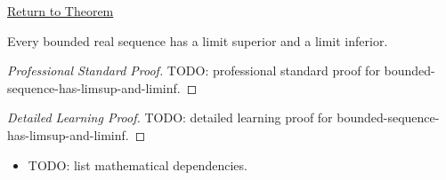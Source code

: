 \newpage
{}
\label{prf:bounded-sequence-limsup-liminf}

\begin{remark*}[Return]
\hyperref[thm:bounded-sequence-limsup-liminf]{Return to Theorem}
\end{remark*}

\begin{theorem*}
Every bounded real sequence has a limit superior and a limit inferior.

\smallskip
\noindent
\end{theorem*}

\begin{proof}[Professional Standard Proof]
\LRAProofBodyStart
TODO: professional standard proof for bounded-sequence-has-limsup-and-liminf.
\end{proof}

\begin{proof}[Detailed Learning Proof]
\LRAProofBodyStart
TODO: detailed learning proof for bounded-sequence-has-limsup-and-liminf.
\end{proof}

\begin{remark*}
\end{remark*}

\begin{dependencies}
\begin{itemize}
  \item TODO: list mathematical dependencies.
\end{itemize}
\end{dependencies}

\clearpage
